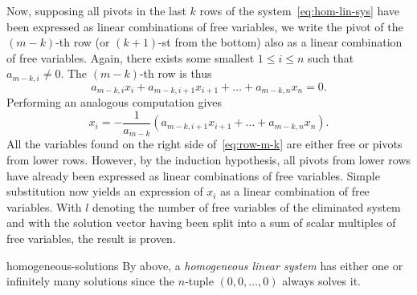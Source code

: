 \begin{propproof}
 Now, supposing all pivots in the last $k$ rows of the
 system~\eqref{eq:hom-lin-sys} have been expressed as linear combinations of
 free variables, we write the pivot of the $(m-k)$-th row (or $(k+1)$-st from
 the bottom) also as a linear combination of free variables. Again, there exists
 some smallest $1 \leq i \leq n$ such that $a_{m-k,i} \neq 0$. The $(m-k)$-th
 row is thus
 \[
  a_{m-k,i}x_i + a_{m-k,i+1}x_{i+1} + \ldots + a_{m-k,n}x_n = 0.
 \]
 Performing an analogous computation gives
 \begin{equation}
  \label{eq:row-m-k}
  x_i = - \frac{1}{a_{m-k}}(a_{m-k,i+1}x_{i+1} + \ldots + a_{m-k,n}x_n).
 \end{equation}
 All the variables found on the right side of~\eqref{eq:row-m-k} are either free
 or pivots from lower rows. However, by the induction hypothesis, all pivots
 from lower rows have already been expressed as linear combinations of free
 variables. Simple substitution now yields an expression of $x_i$ as a linear
 combination of free variables. With $l$ denoting the number of free variables
 of the eliminated system and with the solution vector having been split into a
 sum of scalar multiples of free variables, the result is proven.
\end{propproof}

\begin{remark}{}{homogeneous-solutions}
 By  above,
 a \emph{homogeneous linear system} has either one or infinitely many solutions
 since the $n$-tuple $(0,0,\ldots,0)$ always solves it.
\end{remark}

